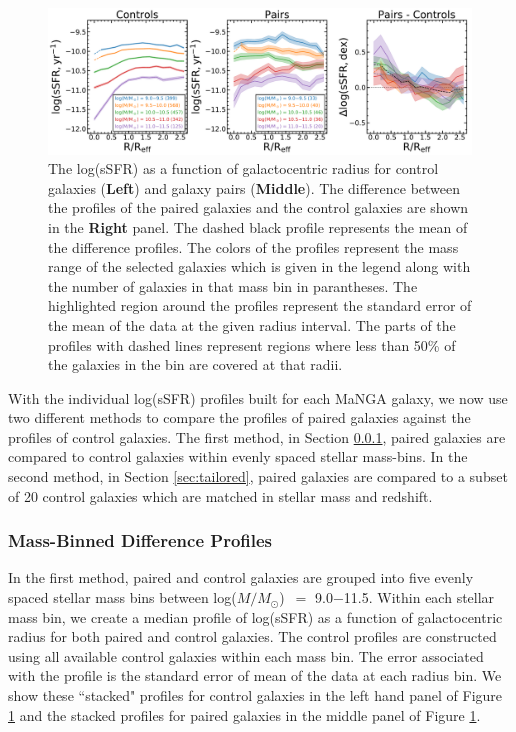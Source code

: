 \documentclass[iop,revtex4,twocolumn,apj,numberedappendix,appendixfloats]{emulateapj}
\newcommand{\logm}{log($M/M_{\odot}$)}
\begin{document}
\begin{figure}
\centering
\includegraphics[width=\linewidth]{fig/ssfr_comb.pdf}
\caption[]{The log(sSFR) as a function of galactocentric radius for control galaxies (\textbf{Left}) and galaxy pairs (\textbf{Middle}). The difference between the profiles of the paired galaxies and the control galaxies are shown in the \textbf{Right} panel. The dashed black profile represents the mean of the difference profiles. The colors of the profiles represent the mass range of the selected galaxies which is given in the legend along with the number of galaxies in that mass bin in parantheses. The highlighted region around the profiles represent the standard error of the mean of the data at the given radius interval. The parts of the profiles with dashed lines represent regions where less than 50\% of the galaxies in the bin are covered at that radii. }
\label{fig:ssfr_prof}
\end{figure}

With the individual log(sSFR) profiles built for each MaNGA galaxy, we now use two different methods to compare the profiles of paired galaxies against the profiles of control galaxies. The first method, in Section \ref{sec:mass-bin}, paired galaxies are compared to control galaxies within evenly spaced stellar mass-bins. In the second method, in Section \ref{sec:tailored}, paired galaxies are compared to a subset of 20 control galaxies which are matched in stellar mass and redshift. 

\subsubsection{Mass-Binned Difference Profiles}\label{sec:mass-bin}

In the first method, paired and control galaxies are grouped into five evenly spaced stellar mass bins between \logm\ $=$ 9.0$-$11.5. Within each stellar mass bin, we create a median profile of log(sSFR) as a function of galactocentric radius for both paired and control galaxies. The control profiles are constructed using all available control galaxies within each mass bin. The error associated with the profile is the standard error of mean of the data at each radius bin. We show these ``stacked" profiles for control galaxies in the left hand panel of Figure \ref{fig:ssfr_prof} and the stacked profiles for paired galaxies in the middle panel of Figure \ref{fig:ssfr_prof}.
\end{document}

